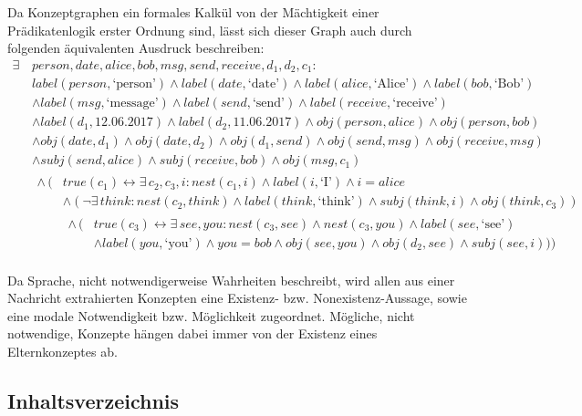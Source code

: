 \documentclass[11pt, a4paper]{scrreprt}
\begin{document}
Da Konzeptgraphen ein formales Kalkül von der Mächtigkeit einer Prädikatenlogik erster Ordnung sind, lässt sich dieser Graph auch durch folgenden äquivalenten Ausdruck beschreiben:
\begin{align*}
	\exists\,& person, date, alice, bob, msg, send, receive, d_1, d_2, c_1:\\
	& label(person, \text{`person'}) \land label(date, \text{`date'}) \land label(alice, \text{`Alice'}) \land label(bob, \text{`Bob'})\\
	& \land label(msg, \text{`message'}) \land label(send, \text{`send'}) \land label(receive, \text{`receive'})\\
	& \land label(d_1, 12.06.2017) \land label(d_2, 11.06.2017) \land obj(person, alice) \land obj(person, bob)\\
	& \land obj(date, d_1) \land obj(date, d_2) \land obj(d_1, send) \land obj(send, msg) \land obj(receive, msg)\\
	& \land subj(send, alice) \land subj(receive, bob) \land obj(msg, c_1)\\
	& \begin{aligned}
		\land\, (&true(c_1) \leftrightarrow \exists\, c_2, c_3, i: nest(c_1, i) \land label(i, \text{`I'}) \land i = alice\\
		& \land (\lnot\exists\, think: nest(c_2, think) \land label(think, \text{`think'}) \land subj(think, i) \land obj(think, c_3))\\
		& \begin{aligned}
			\land\, (&true(c_3) \leftrightarrow \exists\, see, you: nest(c_3, see) \land nest(c_3, you) \land label(see, \text{`see'})\\
			& \land label(you, \text{`you'}) \land you = bob \land obj(see, you) \land obj(d_2, see) \land subj(see, i)))
		\end{aligned}
	\end{aligned}
\end{align*}

Da Sprache, nicht notwendigerweise Wahrheiten beschreibt, wird allen aus einer Nachricht extrahierten Konzepten eine Existenz- bzw. Nonexistenz-Aussage, sowie eine modale Notwendigkeit bzw. Möglichkeit zugeordnet.
Mögliche, nicht notwendige, Konzepte hängen dabei immer von der Existenz eines Elternkonzeptes ab.

\pagebreak

\subsection{Inhaltsverzeichnis}
\end{document}
